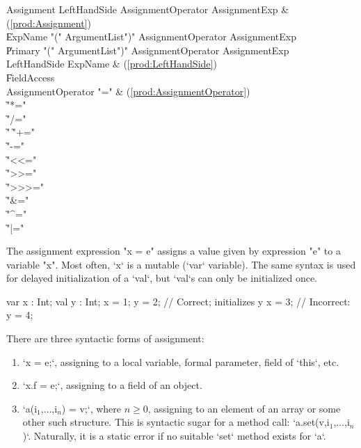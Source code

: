 \begin{bbgrammar}
          Assignment \: LeftHandSide AssignmentOperator AssignmentExp & (\ref{prod:Assignment}) \\
                    \| ExpName  \xcd"(" ArgumentList\opt \xcd")" AssignmentOperator AssignmentExp \\
                    \| Primary  \xcd"(" ArgumentList\opt \xcd")" AssignmentOperator AssignmentExp \\
        LeftHandSide \: ExpName & (\ref{prod:LeftHandSide}) \\
                    \| FieldAccess \\
  AssignmentOperator \: \xcd"=" & (\ref{prod:AssignmentOperator}) \\
                    \| \xcd"*=" \\
                    \| \xcd"/=" \\
                    \| \xcd"%
                    \| \xcd"+=" \\
                    \| \xcd"-=" \\
                    \| \xcd"<<=" \\
                    \| \xcd">>=" \\
                    \| \xcd">>>=" \\
                    \| \xcd"&=" \\
                    \| \xcd"^=" \\
                    \| \xcd"|=" \\
\end{bbgrammar}



The assignment expression \xcd"x = e" assigns a value given by
expression \xcd"e"
to a variable \xcd"x".  
Most often, \xcd`x` is a mutable (\xcd`var` variable).  The same syntax is
used for delayed initialization of a \xcd`val`, but \xcd`val`s can only be
initialized once.
\begin{xten}
  var x : Int;
  val y : Int;
  x = 1;
  y = 2; // Correct; initializes y
  x = 3; 
  // Incorrect: y = 4;
\end{xten}


There are three syntactic forms of
assignment: 
\begin{enumerate}
\item \xcd`x = e;`, assigning to a local variable, formal parameter, field of
      \xcd`this`, etc. 
\item \xcd`x.f = e;`, assigning to a field of an object.
\item \xcdmath`a(i$_1$,$\ldots$,i$_n$) = v;`, where {$n \ge 0$}, assigning to
      an element of an array or some other such structure. This is syntactic
      sugar for a method call: \xcdmath`a.set(v,i$_1$,$\ldots$,i$_n$)`.
      Naturally, it is a static error if no suitable \xcd`set` method exists
      for \xcd`a`.
\end{enumerate}

